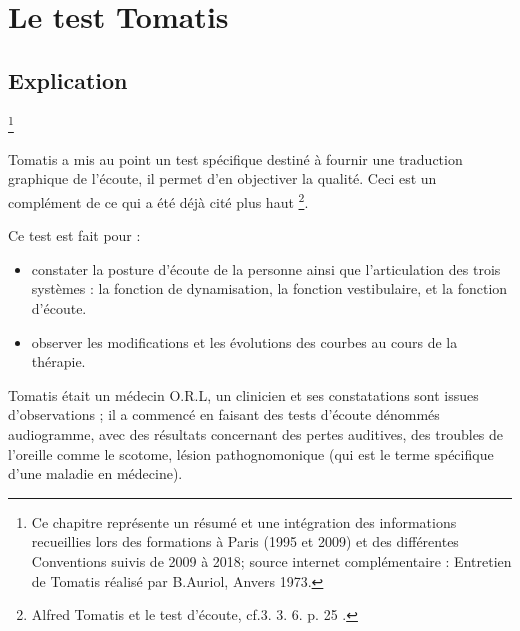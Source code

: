 \chapter{Le test Tomatis}

\section{Explication}

\footnote{Ce chapitre représente un résumé et une intégration des informations recueillies lors des formations à Paris (1995 et 2009) et des différentes Conventions suivis de 2009 à 2018; source internet complémentaire : Entretien de Tomatis réalisé par B.Auriol, Anvers 1973.}

Tomatis a mis au point un test spécifique destiné à fournir une traduction
graphique de l'écoute, il permet d'en objectiver la qualité. Ceci est un complément de ce qui a été déjà cité plus haut%
 \footnote{Alfred Tomatis et le test d'écoute, cf.3. 3. 6. p. 25 .}.
 

Ce test est fait pour :
\begin{itemize}
\item constater la posture d'écoute de la personne ainsi que l'articulation
des trois systèmes : la fonction de dynamisation, la fonction vestibulaire,
et la fonction d'écoute.
\item observer les modifications et les évolutions des courbes au cours
de la thérapie.
\end{itemize}
Tomatis était un médecin O.R.L, un clinicien et  ses constatations
sont issues d'observations ; il a commencé en faisant
des tests d'écoute dénommés audiogramme, avec des résultats concernant  des pertes auditives, des troubles de l'oreille
comme le scotome, lésion pathognomonique (qui est le terme spécifique
d'une maladie en médecine). 

